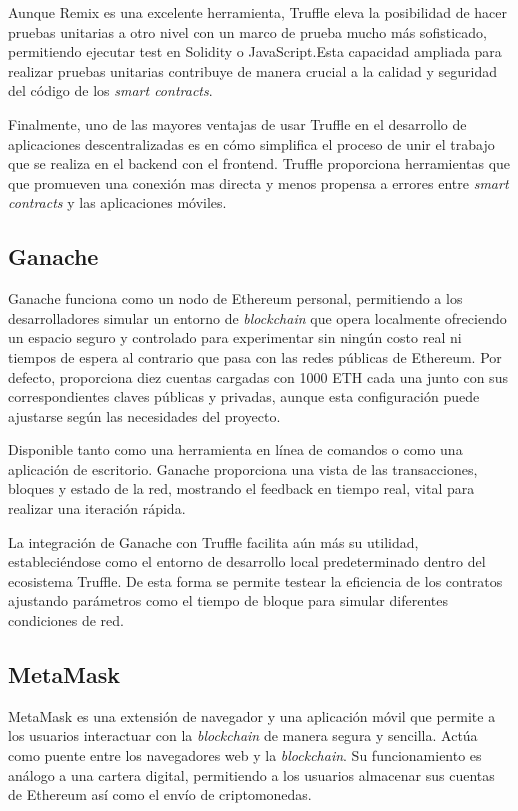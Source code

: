 Aunque Remix es una excelente herramienta, Truffle eleva la posibilidad de hacer pruebas unitarias a otro nivel con un marco de prueba mucho más sofisticado, permitiendo ejecutar test en Solidity o JavaScript.Esta capacidad ampliada para realizar pruebas unitarias contribuye de manera crucial a la calidad y seguridad del código de los \textit{smart contracts}.

Finalmente, uno de las mayores ventajas de usar Truffle en el desarrollo de aplicaciones descentralizadas es en cómo simplifica el proceso de unir el trabajo que se realiza en el backend con el frontend. Truffle proporciona herramientas que que promueven una conexión mas directa y menos propensa a errores entre \textit{smart contracts} y las aplicaciones móviles.


\subsection{Ganache}

Ganache funciona como un nodo de Ethereum personal, permitiendo a los desarrolladores simular un entorno de \textit{blockchain} que opera localmente ofreciendo un espacio seguro y controlado para experimentar sin ningún costo real ni tiempos de espera al contrario que pasa con las redes públicas de Ethereum.
Por defecto, proporciona diez cuentas cargadas con 1000 ETH cada una junto con sus correspondientes claves públicas y privadas, aunque esta configuración puede ajustarse según las necesidades del proyecto.

Disponible tanto como una herramienta en línea de comandos o como una aplicación de escritorio. Ganache proporciona  una vista de las transacciones, bloques y estado de la red, mostrando el feedback en tiempo real, vital para realizar una iteración rápida.

La integración de Ganache con Truffle facilita aún más su utilidad, estableciéndose como el entorno de desarrollo local predeterminado dentro del ecosistema Truffle.
De esta forma se permite testear la eficiencia de los contratos ajustando parámetros como el tiempo de bloque para simular diferentes condiciones de red.


\subsection{MetaMask}

MetaMask es una extensión de navegador y una aplicación móvil que permite a los usuarios interactuar con la \textit{blockchain} de manera segura y sencilla. Actúa como puente entre los navegadores web y la \textit{blockchain}.
Su funcionamiento es análogo a una cartera digital, permitiendo a los usuarios almacenar sus cuentas de Ethereum así como el envío de criptomonedas.

